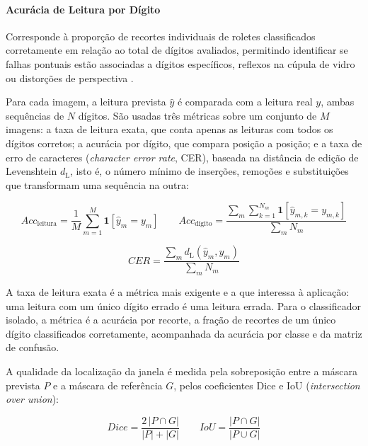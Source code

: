 \paragraph{Acurácia de Leitura por Dígito}
Corresponde à proporção de recortes individuais de roletes classificados
corretamente em relação ao total de dígitos avaliados, permitindo identificar
se falhas pontuais estão associadas a dígitos específicos, reflexos na cúpula
de vidro ou distorções de perspectiva \cite{barkat2024smart}.

Para cada imagem, a leitura prevista $\hat{y}$ é comparada com a
leitura real $y$, ambas sequências de $N$ dígitos. São usadas três métricas sobre um
conjunto de $M$ imagens: a taxa de leitura exata, que conta apenas as leituras com todos os
dígitos corretos; a acurácia por dígito, que compara posição a posição; e a taxa de erro de
caracteres (\textit{character error rate}, CER), baseada na distância de edição de
Levenshtein $d_{\mathrm{L}}$, isto é, o número mínimo de inserções, remoções e substituições
que transformam uma sequência na outra:

\begin{equation}
    \label{eq:leitura_exata}
    Acc_{\mathrm{leitura}} = \frac{1}{M}\sum_{m=1}^{M} \mathbf{1}\!\left[\hat{y}_m = y_m\right]
    \qquad
    Acc_{\textrm{dígito}} = \frac{\sum_{m}\sum_{k=1}^{N_m} \mathbf{1}\!\left[\hat{y}_{m,k} = y_{m,k}\right]}{\sum_{m} N_m}
\end{equation}

\begin{equation}
    \label{eq:cer}
    CER = \frac{\sum_{m} d_{\mathrm{L}}(\hat{y}_m, y_m)}{\sum_{m} N_m}
\end{equation}

A taxa de leitura exata é a métrica mais exigente e a que interessa à aplicação: uma
leitura com um único dígito errado é uma leitura errada. Para o classificador isolado, a
métrica é a acurácia por recorte, a fração de recortes de um único dígito classificados
corretamente, acompanhada da acurácia por classe e da matriz de confusão.

A qualidade da localização da janela é medida pela sobreposição entre a máscara prevista
$P$ e a máscara de referência $G$, pelos coeficientes Dice e IoU (\textit{intersection over
union}):

\begin{equation}
    \label{eq:dice_iou}
    Dice = \frac{2\,|P \cap G|}{|P| + |G|}
    \qquad
    IoU = \frac{|P \cap G|}{|P \cup G|}
\end{equation}

